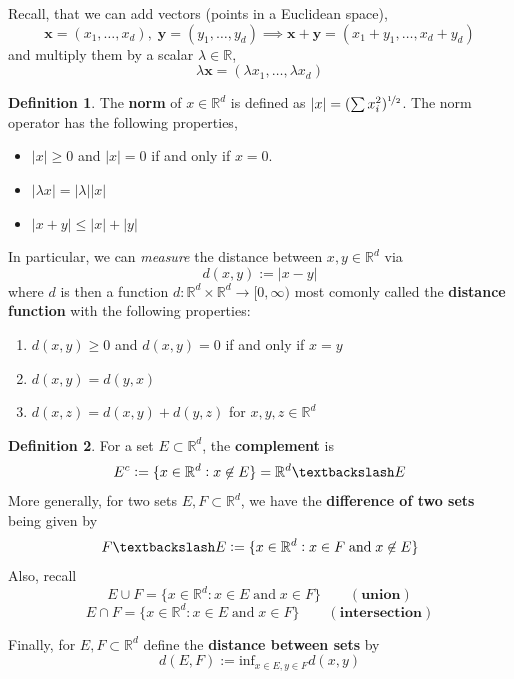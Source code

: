 \documentclass[a4paper, 11pt]{book}
\theoremstyle{definition}
\newtheorem{definition}{Definition}[section]
\theoremstyle{remark}
\begin{document}
    Recall, that we can add vectors (points in a Euclidean space),
    \[ \mathbf{x} = (x_1,\hdots,x_d),\;\mathbf{y} = (y_1,\hdots,y_d)\implies \mathbf{x}+\mathbf{y} = (x_1+y_1,\hdots,x_d+y_d) \]
    and multiply them by a scalar $\lambda\in\mathbb{R}$,
    \[ \lambda\mathbf{x} = (\lambda x_1,\hdots,\lambda x_d) \]

    \begin{definition}
        The \textbf{norm} of $x\in\mathbb{R}^d$ is defined as $|x| = (\sum x_i^2)^{\nicefrac{1}{2}}$. The norm operator has
        the following properties,
        \begin{itemize}
            \item $|x|\geq 0$ and $|x|=0$ if and only if $x=0$.
            \item $|\lambda x| = |\lambda||x|$
            \item $|x+y| \leq |x| + |y|$
        \end{itemize}
    \end{definition}

    In particular, we can \textit{measure} the distance between $x,y\in\mathbb{R}^d$ via
    \[ d(x,y) := |x-y| \]
    where $d$ is then a function $d:\mathbb{R}^d\times\mathbb{R}^d\to[0,\infty)$ most comonly called the \textbf{distance function}
    with the following properties:
    \begin{enumerate}
        \item $d(x,y)\geq 0$ and $d(x,y)=0$ if and only if $x=y$
        \item $d(x,y) = d(y,x)$
        \item $d(x,z) = d(x,y) + d(y,z)$ for $x,y,z\in \mathbb{R}^d$
    \end{enumerate}

    \begin{definition}
        For a set $E\subset\mathbb{R}^d$, the \textbf{complement} is
        \[ E^c := \{x\in\mathbb{R}^d: x\not\in E\} = \mathbb{R}^d\textbackslash E \]
        More generally, for two sets $E,F\subset\mathbb{R}^d$, we have the \textbf{difference of two sets} being given by
        \[ F\textbackslash E := \{x\in\mathbb{R}^d: x\in F\;\text{and}\;x\not\in E\} \]
        Also, recall
        \[ E \cup F = \{x\in\mathbb{R}^d: x\in E\;\text{and}\;x\in F\}\qquad(\textbf{union}) \]
        \[ E \cap F = \{x\in\mathbb{R}^d: x\in E\;\text{and}\;x\in F\}\qquad(\textbf{intersection}) \]

        Finally, for $E,F\subset\mathbb{R}^d$ define the \textbf{distance between sets} by
        \[ d(E,F) := \text{inf}_{x\in E, y\in F} d(x,y) \]
    \end{definition}
\end{document}
